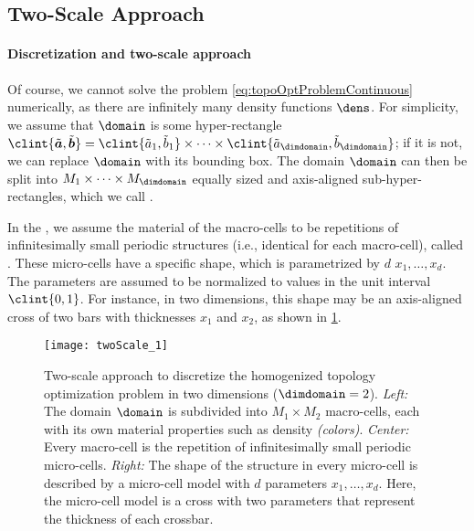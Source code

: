 \subsection{Two-Scale Approach}
\label{sec:612twoScale}

\paragraph{Discretization and two-scale approach}

Of course, we cannot solve the problem \eqref{eq:topoOptProblemContinuous}
numerically,
as there are infinitely many density functions $\dens$.
For simplicity, we assume that $\domain$ is some hyper-rectangle
$\clint{\tilde{\*a}, \tilde{\*b}}
= \clint{\tilde{a}_1, \tilde{b}_1} \times \dotsb \times
\clint{\tilde{a}_{\dimdomain}, \tilde{b}_{\dimdomain}}$;
if it is not, we can replace $\domain$ with its bounding box.
The domain $\domain$ can then be split into
$M_1 \times \dotsb \times M_{\dimdomain}$
equally sized and axis-aligned sub-hyper-rectangles,
which we call .

In the ,
we assume the material of the macro-cells to be
repetitions of infinitesimally small periodic structures
(i.e., identical for each macro-cell),
called .
These micro-cells have a specific shape, which is parametrized by
$d$  $x_1, \dotsc, x_d$.
The parameters are assumed to be normalized to values in the
unit interval $\clint{0, 1}$.
For instance, in two dimensions,
this shape may be an axis-aligned cross of two bars
with thicknesses $x_1$ and $x_2$, as shown in \cref{fig:twoScale}.

\begin{figure}
  \texttt{[image: twoScale\_1]}%
  \caption[%
    Two-scale approach for topology optimization%
  ]{%
    Two-scale approach to discretize the homogenized topology
    optimization problem in two dimensions ($\dimdomain = 2$).
    \emph{Left:} The domain $\domain$ is subdivided into $M_1 \times M_2$
    macro-cells, each with its own material properties such as density
    \emph{(colors)}.
    \emph{Center:} Every macro-cell is the repetition of infinitesimally small
    periodic micro-cells.
    \emph{Right:} The shape of the structure in every micro-cell is
    described by a micro-cell model with $d$ parameters $x_1, \dotsc, x_d$.
    Here, the micro-cell model is a cross with two parameters
    that represent the thickness of each crossbar.%
  }%
  \label{fig:twoScale}%
\end{figure}

